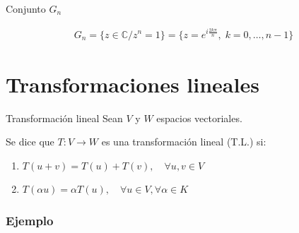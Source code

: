 \begin{definicion}{Conjunto $G_n$}{}

    \begin{gather*}
        G_n = \{ z \in \mathbb{C} / z^n = 1 \} 
        = \{ z=e^{i\frac{2k\pi}{n}}, \; k = 0, \dotsc, n-1 \}
    \end{gather*}

\end{definicion}



\section{Transformaciones lineales}

\begin{definicion}{Transformación lineal}{}
    Sean $V$ y $W$ espacios vectoriales.

    \medskip

    Se dice que $T: V \to W$ es una transformación lineal (T.L.) si:

    \begin{enumerate}
        \item $T(u+v) = T(u) +T(v), \quad \forall u,v \in V$ 
        \item $T(\alpha u) = \alpha T(u), \quad \forall u \in V, 
            \forall \alpha \in K$
    \end{enumerate}
\end{definicion}


\subsubsection{Ejemplo}

